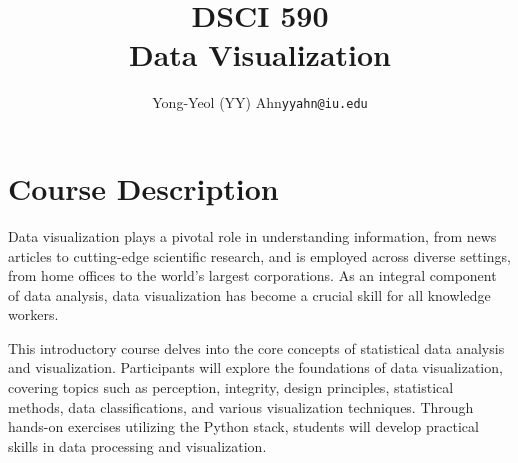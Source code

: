 \documentclass[11pt,article,oneside]{memoir} %
\makeatletter
\def\myauthor{Author}
\def\mytitle{Title}
\def\myaddress{\url{https://iu.zoom.us/my/yyahn}}
\def\myemail{yyahn@iu.edu}
\def\myauthor{Yong-Yeol (YY) Ahn}
\def\mytitle{{\normalsize DSCI 590} \\ \HUGE{} Data Visualization}
\makeatother
\begin{document}

\title{\LARGE \mytitle} %
\author{\Large\myauthor\newline \footnotesize\texttt{\noindent\myemail}}


\maketitle 

\vspace{-20pt}{Office hours: see Canvas} 


\section{Course Description}%

Data visualization plays a pivotal role in understanding information, from news
articles to cutting-edge scientific research, and is employed across diverse
settings, from home offices to the world's largest corporations. As an integral
component of data analysis, data visualization has become a crucial skill for
all knowledge workers.

This introductory course delves into the core concepts of statistical data
analysis and visualization. Participants will explore the foundations of data
visualization, covering topics such as perception, integrity, design principles,
statistical methods, data classifications, and various visualization techniques.
Through hands-on exercises utilizing the Python stack, students will develop
practical skills in data processing and visualization.
\end{document}
